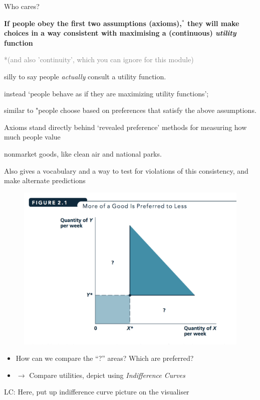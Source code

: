 \documentclass[table]{beamer}
\providecommand{\tightlist}{%
  \setlength{\itemsep}{0pt}\setlength{\parskip}{0pt}}
\begin{document}
\begin{frame}

\begin{block}{Who cares?}

\bigskip

\textbf{If people obey the first two assumptions (axioms),\(^\ast\) they
will make choices in a way consistent with maximising a (continuous)
\emph{utility} function}

\bigskip

\textcolor{gray}{*(and also 'continuity', which you can ignore for this module)}

silly to say people \emph{actually} consult a utility function.

instead `people behave as if they are maximizing utility functions';

similar to "people choose based on preferences that satisfy the above
assumptions.

Axioms stand directly behind `revealed preference' methods for measuring
how much people value

nonmarket goods, like clean air and national parks.

Also gives a vocabulary and a way to test for violations of this
consistency, and make alternate predictions

\end{block}

\end{frame}

\begin{frame}

\begin{figure}

{\centering \includegraphics[width=0.6\linewidth]{picsfigs/moreisbetter} 

}

\end{figure}

\begin{itemize}
\tightlist
\item
  How can we compare the ``?'' areas? Which are preferred?
\end{itemize}

\begin{itemize}[<+->]
\tightlist
\item
  \(\rightarrow\) Compare utilities, depict using \emph{Indifference
  Curves}
\end{itemize}

LC: Here, put up indifference curve picture on the visualiser

\end{frame}
\end{document}
